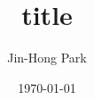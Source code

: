 \documentclass[prl, tightenlines, notitlepage, onecolumn, showpacs, superscriptaddress, longbibliography]{revtex4-1}
\begin{document}
\title{title}
\author{Jin-Hong Park}
\date{\today}

\maketitle

{\bf 

}

%
\section{}



%
\section{}

\begin{figure}[h]
\begin{center}
\caption{ } 
\label{}
\end{center}
\end{figure}



%


%







\end{document}
